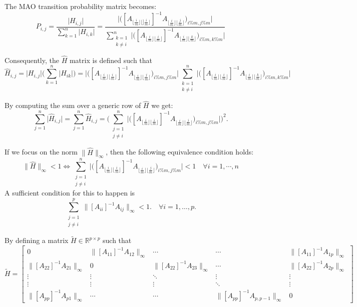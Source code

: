 \documentclass[a4paper,10pt]{article}
\begin{document}
The MAO transition probability matrix becomes:
\[
 P_{i,j}=\frac{\lvert H_{i,j} \rvert}{\sum_{k=1}^n\lvert H_{i,k} 
\rvert}=\frac{\bigg \lvert \bigg ([A_{\lfloor 
\frac{i}{m}\rfloor \lfloor] 
\frac{i}{m}\rfloor}]^{-1} A_{\lfloor \frac{i}{m}\rfloor \lfloor 
\frac{j}{m}\rfloor}\bigg )_{i\%m,j\%m}\bigg 
\rvert}{\sum_{\substack{k=1\\k\ne i}}^n\bigg \lvert \bigg 
([A_{\lfloor 
\frac{i}{m}\rfloor \lfloor 
\frac{i}{m}\rfloor}]^{-1} A_{\lfloor \frac{i}{m}\rfloor \lfloor 
\frac{k}{m}\rfloor}\bigg )_{i\%m,k\%m}\bigg \rvert}
\]

Consequently, the $\hat{H}$ matrix is defined such that
\[
\hat{H}_{i,j} = \lvert H_{i,j}\rvert\bigg(\sum_{k=1}^n\lvert H_{ik}\rvert\bigg)=
\bigg \lvert \bigg ([A_{\lfloor \frac{i}{m}\rfloor \lfloor 
\frac{i}{m}\rfloor}]^{-1} A_{\lfloor \frac{i}{m}\rfloor \lfloor 
\frac{j}{m}\rfloor}\bigg )_{i\%m,j\%m}\bigg 
\rvert
\sum_{\substack{k=1\\k\ne i}}^n\bigg \lvert \bigg ([A_{\lfloor 
\frac{i}{m}\rfloor \lfloor 
\frac{i}{m}\rfloor}]^{-1} A_{\lfloor \frac{i}{m}\rfloor \lfloor 
\frac{k}{m}\rfloor}\bigg )_{i\%m,k\%m}\bigg \rvert
\]

By computing the sum over a generic row of $\hat{H}$ we get:
\[
 \sum_{j=1}^n \lvert \hat{H}_{i,j}\rvert=\sum_{j=1}^n \hat{H}_{i,j} = 
 \bigg ( \sum_{\substack{j=1\\j\ne i}}^n\bigg \lvert \bigg ([A_{\lfloor 
\frac{i}{m}\rfloor \lfloor 
\frac{i}{m}\rfloor}]^{-1} A_{\lfloor \frac{i}{m}\rfloor \lfloor 
\frac{j}{m}\rfloor}\bigg )_{i\%m,j\%m}\bigg \rvert \bigg ) ^2.
\]

If we focus on the norm $\lVert \hat{H}\rVert_{\infty}$, then the following 
equivalence condition holds:
\[
 \lVert \hat{H}\rVert_{\infty}<1 \Leftrightarrow \sum_{\substack{j=1\\j\ne 
i}}^n\bigg \lvert \bigg ([A_{\lfloor 
\frac{i}{m}\rfloor \lfloor 
\frac{i}{m}\rfloor}]^{-1} A_{\lfloor \frac{i}{m}\rfloor \lfloor 
\frac{j}{m}\rfloor}\bigg )_{i\%m,j\%m}\bigg \rvert <1 \quad \forall 
i=1,\cdots,n
\]
 A sufficient condition for this to happen is
 \begin{equation}
  \sum_{\substack{j=1\\j\ne i}}^p \lVert [A_{ii}]^{-1}A_{ij}\rVert_{\infty}<1.
    \label{block_cs}\quad \forall i=1,\ldots,p.
 \end{equation}

By defining a matrix $\tilde{H}\in \mathbb{R}^{p\times p}$ such that
\[
 \tilde{H}=\begin{bmatrix}0 & \lVert [A_{11}]^{-1}A_{12}\rVert_{\infty} & 
\cdots &
\cdots & \lVert [A_{11}]^{-1}A_{1p}\rVert_{\infty} \\
\lVert [A_{22}]^{-1}A_{21}\rVert_{\infty} & 0 & \lVert 
[A_{22}]^{-1}A_{23}\rVert_{\infty} & 
\cdots & \lVert [A_{22}]^{-1}A_{2p}\rVert_{\infty} \\
\vdots & \vdots & \ddots & \vdots & \vdots\\
\vdots & \vdots & \vdots &\ddots & \vdots \\
\lVert [A_{pp}]^{-1}A_{p1}\rVert_{\infty} &  \cdots & \cdots& 
\lVert [A_{pp}]^{-1}A_{p,p-1}\rVert_{\infty} & 0
\end{bmatrix}
\]
\end{document}
